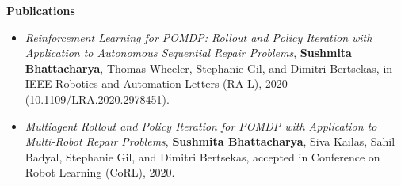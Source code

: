 \documentclass[a4paper,11pt]{article}
\newcommand{\resheading}[1]{{\small \colorbox{mygrey}{\begin{minipage}{0.975\textwidth}{\textbf{#1 \vphantom{p\^{E}}}}\end{minipage}}}}
\begin{document}
	
	
	
	\resheading{\textbf{\large Publications}}
	\begin{description}
	\item 
		\begin{itemize}
		\item \textit{Reinforcement Learning for POMDP: Rollout and Policy Iteration with Application to Autonomous Sequential Repair Problems}, \textbf{Sushmita Bhattacharya}, Thomas Wheeler, Stephanie Gil, and Dimitri Bertsekas, in IEEE Robotics and Automation Letters (RA-L), 2020 (10.1109/LRA.2020.2978451).
	\end{itemize}
\item 
	\begin{itemize}
		\item \textit{Multiagent Rollout and Policy Iteration for POMDP with Application to Multi-Robot Repair Problems}, \textbf{Sushmita Bhattacharya}, Siva Kailas, Sahil Badyal, Stephanie Gil, and Dimitri Bertsekas, accepted in Conference on Robot Learning (CoRL), 2020. 
	\end{itemize}
	\end{description}
	
	
	
\end{document}
